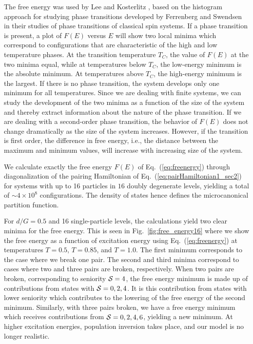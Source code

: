 \documentclass[rmp,aps,floatfix]{revtex4}
\begin{document}
The free energy was used by
Lee and Kosterlitz \cite{lk90,lk91},
based on the histogram approach for studying
phase transitions developed by Ferrenberg and Swendsen \cite{fs88,fs89}
in their studies of phase transitions
of classical spin systems.
If a phase transition is present, a plot of $F(E)$ versus $E$ will show
two local minima which correspond to configurations that are
characteristic of the high and low temperature phases.
At the transition temperature $T_C$, the value of $F(E)$ at the
two minima equal, while at temperatures below $T_C$, the low-energy
minimum is the absolute minimum. At temperatures above $T_C$, the high-energy
minimum is the largest. If there is no
phase transition, the system develops only one minimum for all temperatures.
Since we are dealing with finite systems, we can study the development
of the two minima as a function of the size of the system and thereby
extract information about the nature of the phase transition. If we are dealing
with a second-order phase transition, the behavior of $F(E)$ does not change
dramatically as the size of the system increases. However, if the transition
is first order, the difference in free energy, i.e.,
the distance between the maximum and minimum values,
will increase with increasing size of the system.


We calculate exactly the  
free energy $F(E)$ of Eq.~(\ref{eq:freenergy})
through diagonalization of the pairing Hamiltonian of 
Eq.~(\ref{eq:pairHamiltonian1_sec2})
for systems with up to 16 particles in $16$ doubly degenerate
levels, yielding a total of $\sim 4\times 10^8$ configurations. The
density of states hence defines the microcanonical partition function.


For $d/G=0.5$ and 16 single-particle levels, the calculations yield
two clear  minima for the free energy.
This is seen in
Fig.~\ref{fig:free_energy16} where we show the free energy as a function of 
excitation energy
using Eq.~(\ref{eq:freenergy}) at temperatures $T=0.5$, $T=0.85$, and $T=1.0$.
The first minimum corresponds to the case where we break one pair.
The second and third minima  correspond
to cases where two and three pairs are broken, respectively. 
When two pairs are broken, corresponding to seniority ${\cal S}=4$, 
the free energy minimum is made up of contributions
from states with ${\cal S}=0,2,4$. It is this contribution from states 
with lower seniority which contributes to the lowering of the free
energy of the second minimum. Similarly, with three pairs
broken, we have a free energy minimum which receives contributions
from ${\cal S}=0,2,4,6$, yielding a new minimum. 
At higher excitation energies, population
inversion takes place, and our model is no longer realistic. 
\end{document}
